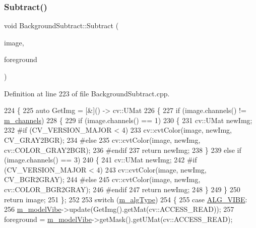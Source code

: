 \subsubsection{\texorpdfstring{Subtract()}{Subtract()}}
{\footnotesize\ttfamily void Background\+Subtract\+::\+Subtract (\begin{DoxyParamCaption}\item[{const cv\+::\+U\+Mat \&}]{image,  }\item[{cv\+::\+U\+Mat \&}]{foreground }\end{DoxyParamCaption})}



Definition at line 223 of file Background\+Subtract.\+cpp.


\begin{DoxyCode}
224 \{
225     \textcolor{keyword}{auto} GetImg = [&]() -> cv::UMat
226     \{
227             \textcolor{keywordflow}{if} (image.channels() != \mbox{\hyperlink{class_background_subtract_a676897a571788e0fee84d568bc68caf0}{m\_channels}})
228     \{
229             \textcolor{keywordflow}{if} (image.channels() == 1)
230     \{
231             cv::UMat newImg;
232 \textcolor{preprocessor}{        #if (CV\_VERSION\_MAJOR < 4)}
233             cv::cvtColor(image, newImg, CV\_GRAY2BGR);
234 \textcolor{preprocessor}{        #else}
235             cv::cvtColor(image, newImg, cv::COLOR\_GRAY2BGR);
236 \textcolor{preprocessor}{        #endif}
237             \textcolor{keywordflow}{return} newImg;
238 \}
239             \textcolor{keywordflow}{else} \textcolor{keywordflow}{if} (image.channels() == 3)
240     \{
241             cv::UMat newImg;
242 \textcolor{preprocessor}{        #if (CV\_VERSION\_MAJOR < 4)}
243             cv::cvtColor(image, newImg, CV\_BGR2GRAY);
244 \textcolor{preprocessor}{        #else}
245             cv::cvtColor(image, newImg, cv::COLOR\_BGR2GRAY);
246 \textcolor{preprocessor}{        #endif}
247             \textcolor{keywordflow}{return} newImg;
248 \}
249 \}
250             \textcolor{keywordflow}{return} image;
251 \};
252 
253     \textcolor{keywordflow}{switch} (\mbox{\hyperlink{class_background_subtract_a3d569052b6954fa87f04a0aa8a970f97}{m\_algType}})
254     \{
255     \textcolor{keywordflow}{case} \mbox{\hyperlink{class_background_subtract_a56850081696df68b55f87b4f3d87949fa1905f812773a0029b59688e57990f172}{ALG\_VIBE}}:
256         \mbox{\hyperlink{class_background_subtract_a57c251abeed9a2c73a3c97d0f7f8b527}{m\_modelVibe}}->update(GetImg().getMat(cv::ACCESS\_READ));
257         foreground = \mbox{\hyperlink{class_background_subtract_a57c251abeed9a2c73a3c97d0f7f8b527}{m\_modelVibe}}->getMask().getUMat(cv::ACCESS\_READ);

\end{DoxyCode}
